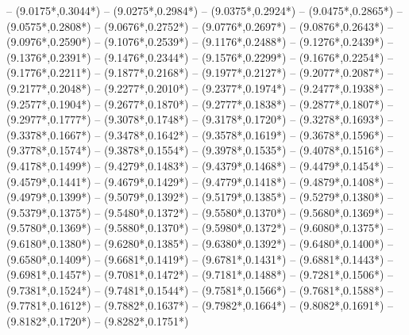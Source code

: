 {	-- ({9.0175*\dx},{0.3044*\dy})
	-- ({9.0275*\dx},{0.2984*\dy})
	-- ({9.0375*\dx},{0.2924*\dy})
	-- ({9.0475*\dx},{0.2865*\dy})
	-- ({9.0575*\dx},{0.2808*\dy})
	-- ({9.0676*\dx},{0.2752*\dy})
	-- ({9.0776*\dx},{0.2697*\dy})
	-- ({9.0876*\dx},{0.2643*\dy})
	-- ({9.0976*\dx},{0.2590*\dy})
	-- ({9.1076*\dx},{0.2539*\dy})
	-- ({9.1176*\dx},{0.2488*\dy})
	-- ({9.1276*\dx},{0.2439*\dy})
	-- ({9.1376*\dx},{0.2391*\dy})
	-- ({9.1476*\dx},{0.2344*\dy})
	-- ({9.1576*\dx},{0.2299*\dy})
	-- ({9.1676*\dx},{0.2254*\dy})
	-- ({9.1776*\dx},{0.2211*\dy})
	-- ({9.1877*\dx},{0.2168*\dy})
	-- ({9.1977*\dx},{0.2127*\dy})
	-- ({9.2077*\dx},{0.2087*\dy})
	-- ({9.2177*\dx},{0.2048*\dy})
	-- ({9.2277*\dx},{0.2010*\dy})
	-- ({9.2377*\dx},{0.1974*\dy})
	-- ({9.2477*\dx},{0.1938*\dy})
	-- ({9.2577*\dx},{0.1904*\dy})
	-- ({9.2677*\dx},{0.1870*\dy})
	-- ({9.2777*\dx},{0.1838*\dy})
	-- ({9.2877*\dx},{0.1807*\dy})
	-- ({9.2977*\dx},{0.1777*\dy})
	-- ({9.3078*\dx},{0.1748*\dy})
	-- ({9.3178*\dx},{0.1720*\dy})
	-- ({9.3278*\dx},{0.1693*\dy})
	-- ({9.3378*\dx},{0.1667*\dy})
	-- ({9.3478*\dx},{0.1642*\dy})
	-- ({9.3578*\dx},{0.1619*\dy})
	-- ({9.3678*\dx},{0.1596*\dy})
	-- ({9.3778*\dx},{0.1574*\dy})
	-- ({9.3878*\dx},{0.1554*\dy})
	-- ({9.3978*\dx},{0.1535*\dy})
	-- ({9.4078*\dx},{0.1516*\dy})
	-- ({9.4178*\dx},{0.1499*\dy})
	-- ({9.4279*\dx},{0.1483*\dy})
	-- ({9.4379*\dx},{0.1468*\dy})
	-- ({9.4479*\dx},{0.1454*\dy})
	-- ({9.4579*\dx},{0.1441*\dy})
	-- ({9.4679*\dx},{0.1429*\dy})
	-- ({9.4779*\dx},{0.1418*\dy})
	-- ({9.4879*\dx},{0.1408*\dy})
	-- ({9.4979*\dx},{0.1399*\dy})
	-- ({9.5079*\dx},{0.1392*\dy})
	-- ({9.5179*\dx},{0.1385*\dy})
	-- ({9.5279*\dx},{0.1380*\dy})
	-- ({9.5379*\dx},{0.1375*\dy})
	-- ({9.5480*\dx},{0.1372*\dy})
	-- ({9.5580*\dx},{0.1370*\dy})
	-- ({9.5680*\dx},{0.1369*\dy})
	-- ({9.5780*\dx},{0.1369*\dy})
	-- ({9.5880*\dx},{0.1370*\dy})
	-- ({9.5980*\dx},{0.1372*\dy})
	-- ({9.6080*\dx},{0.1375*\dy})
	-- ({9.6180*\dx},{0.1380*\dy})
	-- ({9.6280*\dx},{0.1385*\dy})
	-- ({9.6380*\dx},{0.1392*\dy})
	-- ({9.6480*\dx},{0.1400*\dy})
	-- ({9.6580*\dx},{0.1409*\dy})
	-- ({9.6681*\dx},{0.1419*\dy})
	-- ({9.6781*\dx},{0.1431*\dy})
	-- ({9.6881*\dx},{0.1443*\dy})
	-- ({9.6981*\dx},{0.1457*\dy})
	-- ({9.7081*\dx},{0.1472*\dy})
	-- ({9.7181*\dx},{0.1488*\dy})
	-- ({9.7281*\dx},{0.1506*\dy})
	-- ({9.7381*\dx},{0.1524*\dy})
	-- ({9.7481*\dx},{0.1544*\dy})
	-- ({9.7581*\dx},{0.1566*\dy})
	-- ({9.7681*\dx},{0.1588*\dy})
	-- ({9.7781*\dx},{0.1612*\dy})
	-- ({9.7882*\dx},{0.1637*\dy})
	-- ({9.7982*\dx},{0.1664*\dy})
	-- ({9.8082*\dx},{0.1691*\dy})
	-- ({9.8182*\dx},{0.1720*\dy})
	-- ({9.8282*\dx},{0.1751*\dy})
}
